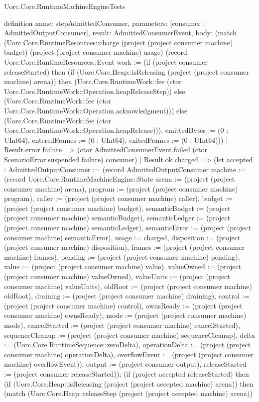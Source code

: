\begin{lexlean}{Uorc.Core.RuntimeMachineEngineTests}
\begin{semanticmodule}
definition{
  name: stepAdmittedConsumer,
  parameters: [consumer : AdmittedOutputConsumer],
  result: AdmittedConsumerEvent,
  body: (match (Uorc.Core.RuntimeResources::charge (project (project consumer machine) budget) (project (project consumer machine) usage) (record Uorc.Core.RuntimeResources::Event {work := (if (project consumer releaseStarted) then (if (Uorc.Core.Heap::isReleasing (project (project consumer machine) arena)) then (Uorc.Core.RuntimeWork::fee (ctor Uorc.Core.RuntimeWork::Operation.heapReleaseStep)) else (Uorc.Core.RuntimeWork::fee (ctor Uorc.Core.RuntimeWork::Operation.acknowledgment))) else (Uorc.Core.RuntimeWork::fee (ctor Uorc.Core.RuntimeWork::Operation.heapRelease))), emittedBytes := (0 : UInt64), enteredFrames := (0 : UInt64), exitedFrames := (0 : UInt64)}))
    | Result.error failure => (ctor AdmittedConsumerEvent.failed (ctor ScenarioError.suspended failure) consumer)
    | Result.ok charged => (let accepted : AdmittedOutputConsumer := (record AdmittedOutputConsumer {machine := (record Uorc.Core.RuntimeMachineEngine::State {arena := (project (project consumer machine) arena), program := (project (project consumer machine) program), caller := (project (project consumer machine) caller), budget := (project (project consumer machine) budget), semanticBudget := (project (project consumer machine) semanticBudget), semanticLedger := (project (project consumer machine) semanticLedger), semanticError := (project (project consumer machine) semanticError), usage := charged, disposition := (project (project consumer machine) disposition), frames := (project (project consumer machine) frames), pending := (project (project consumer machine) pending), value := (project (project consumer machine) value), valueOwned := (project (project consumer machine) valueOwned), valueUnits := (project (project consumer machine) valueUnits), oldRoot := (project (project consumer machine) oldRoot), draining := (project (project consumer machine) draining), control := (project (project consumer machine) control), ownsReady := (project (project consumer machine) ownsReady), mode := (project (project consumer machine) mode), cancelStarted := (project (project consumer machine) cancelStarted), sequenceCleanup := (project (project consumer machine) sequenceCleanup), delta := (Uorc.Core.RuntimeSequence::zeroDelta), operationDelta := (project (project consumer machine) operationDelta), overflowEvent := (project (project consumer machine) overflowEvent)}), output := (project consumer output), releaseStarted := (project consumer releaseStarted)}); (if (project accepted releaseStarted) then (if (Uorc.Core.Heap::isReleasing (project (project accepted machine) arena)) then (match (Uorc.Core.Heap::releaseStep (project (project accepted machine) arena))
}
\end{semanticmodule}
\end{lexlean}

